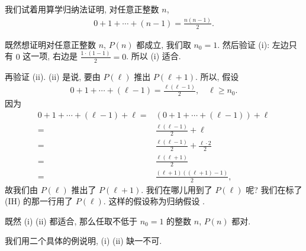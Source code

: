 \begin{example}
    我们试着用算学归纳法证明, 对任意正整数 $n$,
    \begin{align*}
        0 + 1 + \cdots + (n - 1) = \frac{n(n-1)}{2}. \tag*{$P(n) \colon$}
    \end{align*}

    既然想证明对任意正整数 $n$, $P(n)$ 都成立, 我们取 $n_0 = 1$. 然后验证 (i): 左边只有 $0$ 这一项, 右边是 $\frac{1 \cdot (1-1)}{2} = 0$. 所以 (i) 适合.

    再验证 (ii). (ii) 是说, 要由 $P(\ell)$ 推出 $P(\ell + 1)$. 所以, 假设
    \begin{align*}
        0 + 1 + \cdots + (\ell - 1) = \frac{\ell(\ell-1)}{2}, \quad \ell \geq n_0.
    \end{align*}
    因为
    \begin{align*}
        0 + 1 + \cdots + (\ell - 1) + \ell
        = {} & (0 + 1 + \cdots + (\ell - 1)) + \ell            \\
        = {} & \frac{\ell(\ell-1)}{2} + \ell \tag*{(IH)}       \\
        = {} & \frac{\ell(\ell-1)}{2} + \frac{\ell \cdot 2}{2} \\
        = {} & \frac{\ell(\ell+1)}{2}                          \\
        = {} & \frac{(\ell+1)((\ell+1) - 1)}{2},
    \end{align*}
    故我们由 $P(\ell)$ 推出了 $P(\ell + 1)$. 我们在哪儿用到了 $P(\ell)$ 呢? 我们在标了 (IH) 的那一行用了 $P(\ell)$. 这样的假设称为归纳假设 .

    既然 (i) (ii) 都适合, 那么任取不低于 $n_0=1$ 的整数 $n$, $P(n)$ 都对.
\end{example}

我们用二个具体的例说明, (i) (ii) 缺一不可.

